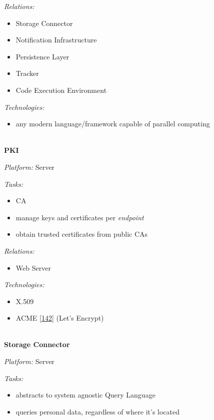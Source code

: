 \documentclass[12pt,english,a4paper,titlepage,cleardoublepage=empty,dottedtoc]{report}
\providecommand{\tightlist}{%
  \setlength{\itemsep}{0pt}\setlength{\parskip}{0pt}}
\begin{document}
\emph{Relations:}

\begin{itemize}
\tightlist
\item
  Storage Connector
\item
  Notification Infrastructure
\item
  Persistence Layer
\item
  Tracker
\item
  Code Execution Environment
\end{itemize}

\emph{Technologies:}

\begin{itemize}
\tightlist
\item
  any modern language/framework capable of parallel computing
\end{itemize}

~\\
\textbf{PKI}

\emph{Platform:} Server

\emph{Tasks:}

\begin{itemize}
\tightlist
\item
  CA
\item
  manage keys and certificates per \emph{endpoint}
\item
  obtain trusted certificates from public CAs
\end{itemize}

\emph{Relations:}

\begin{itemize}
\tightlist
\item
  Web Server
\end{itemize}

\emph{Technologies:}

\begin{itemize}
\tightlist
\item
  X.509
\item
  ACME {[}\protect\hyperlink{ref-web_spec_acme}{142}{]} (Let's Encrypt)
\end{itemize}

~\\
\textbf{Storage Connector}

\emph{Platform:} Server

\emph{Tasks:}

\begin{itemize}
\tightlist
\item
  abstracts to system agnostic Query Language
\item
  queries personal data, regardless of where it's located
\end{itemize}
\end{document}
